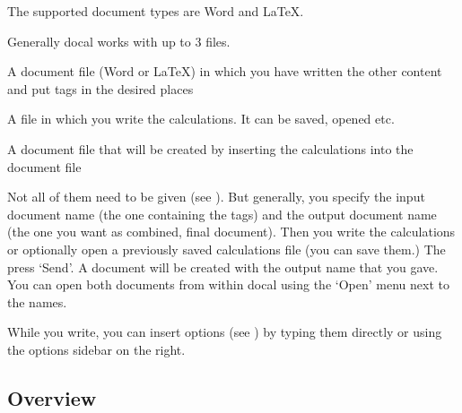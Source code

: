 \documentclass[12pt]{article}
\begin{document}
The supported document types are Word and \LaTeX.

Generally docal works with up to 3 files.
\begin{description}
    \setlength\itemsep{0pt}
    \item[Input document:] A document file (Word or \LaTeX) in which you have
        written the other content and put tags in the desired places
    \item[Calculations file:] A file in which you write the calculations. It
        can be saved, opened etc.
    \item[Output document:] A document file that will be created by inserting
        the calculations into the document file
\end{description}

Not all of them need to be given (see ). But generally, you specify the
input document name (the one containing the tags) and the output document name
(the one you want as combined, final document). Then you write the calculations
or optionally open a previously saved calculations file (you can save them.)
The press `Send'. A document will be created with the output name that you gave.
You can open both documents from within docal using the `Open' menu next to the
names.

While you write, you can insert options (see ) by typing them
directly or using the options sidebar on the right.

\subsection{Overview}
\label{overview}
\end{document}
